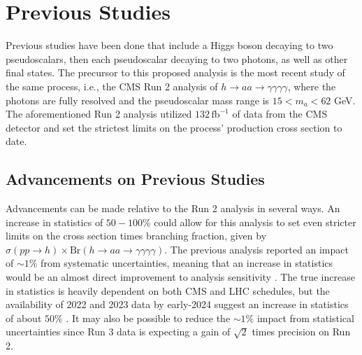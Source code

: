 \documentclass[12pt]{article}
\begin{document}
\section{Previous Studies}
Previous studies have been done that include a Higgs boson decaying to two pseudoscalars, then each pseudoscalar decaying to two photons, as well as other final states. The precursor to this proposed analysis is the most recent study of the same process, i.e., the CMS Run 2 analysis of $h\rightarrow aa \rightarrow \gamma\gamma\gamma\gamma$, where the photons are fully resolved and the pseudoscalar mass range is $15 < m_a < 62$ GeV. The aforementioned Run 2 analysis utilized $132\, \mathrm{fb}^{-1}$ of data from the CMS detector and set the strictest limits on the process' production cross section to date.\par

\subsection{Advancements on Previous Studies}
Advancements can be made relative to the Run 2 analysis in several ways. An increase in statistics of $50-100\%$ could allow for this analysis to set even stricter limits on the cross section times branching fraction, given by $\sigma(pp \rightarrow h) \times \mathrm{Br}(h\rightarrow aa \rightarrow \gamma\gamma\gamma\gamma)$. The previous analysis reported an impact of ${\sim}1\%$ from systematic uncertainties, meaning that an increase in statistics would be an almost direct improvement to analysis sensitivity \cite{Run2_analysis}. The true increase in statistics is heavily dependent on both CMS and LHC schedules, but the  availability of 2022 and 2023 data by early-2024 suggest an increase in statistics of about $50\%$ \cite{PC_CMS_Week}. It may also be possible to reduce the ${\sim}1\%$ impact from statistical uncertainties since Run 3 data is expecting a gain of $\sqrt{2}$ times precision on Run 2.\par
\end{document}
